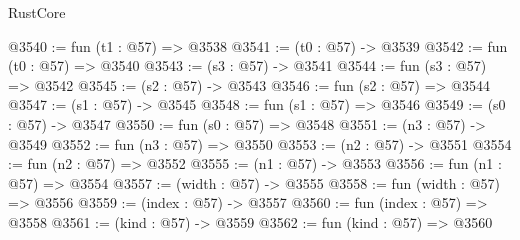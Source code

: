 \begin{lexlean}{RustCore}
\begin{coremodule}
@3540 := fun (t1 : @57) => @3538
@3541 := (t0 : @57) -> @3539
@3542 := fun (t0 : @57) => @3540
@3543 := (s3 : @57) -> @3541
@3544 := fun (s3 : @57) => @3542
@3545 := (s2 : @57) -> @3543
@3546 := fun (s2 : @57) => @3544
@3547 := (s1 : @57) -> @3545
@3548 := fun (s1 : @57) => @3546
@3549 := (s0 : @57) -> @3547
@3550 := fun (s0 : @57) => @3548
@3551 := (n3 : @57) -> @3549
@3552 := fun (n3 : @57) => @3550
@3553 := (n2 : @57) -> @3551
@3554 := fun (n2 : @57) => @3552
@3555 := (n1 : @57) -> @3553
@3556 := fun (n1 : @57) => @3554
@3557 := (width : @57) -> @3555
@3558 := fun (width : @57) => @3556
@3559 := (index : @57) -> @3557
@3560 := fun (index : @57) => @3558
@3561 := (kind : @57) -> @3559
@3562 := fun (kind : @57) => @3560
\end{coremodule}
\end{lexlean}
